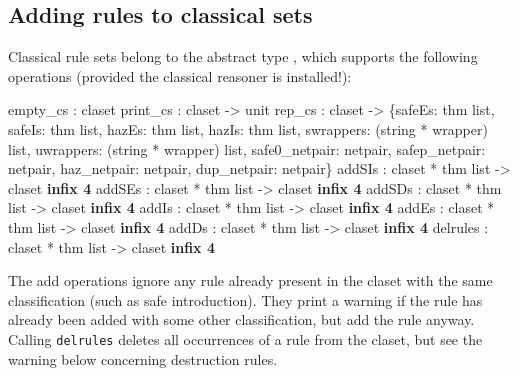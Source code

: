 \subsection{Adding rules to classical sets}
Classical rule sets belong to the abstract type , which
supports the following operations (provided the classical reasoner is
installed!):
\begin{ttbox} 
empty_cs : claset
print_cs : claset -> unit
rep_cs : claset -> \{safeEs: thm list, safeIs: thm list,
                    hazEs: thm list,  hazIs: thm list, 
                    swrappers: (string * wrapper) list, 
                    uwrappers: (string * wrapper) list,
                    safe0_netpair: netpair, safep_netpair: netpair,
                    haz_netpair: netpair, dup_netpair: netpair\}
addSIs   : claset * thm list -> claset                 \hfill{\bf infix 4}
addSEs   : claset * thm list -> claset                 \hfill{\bf infix 4}
addSDs   : claset * thm list -> claset                 \hfill{\bf infix 4}
addIs    : claset * thm list -> claset                 \hfill{\bf infix 4}
addEs    : claset * thm list -> claset                 \hfill{\bf infix 4}
addDs    : claset * thm list -> claset                 \hfill{\bf infix 4}
delrules : claset * thm list -> claset                 \hfill{\bf infix 4}
\end{ttbox}
The add operations ignore any rule already present in the claset with the same
classification (such as safe introduction).  They print a warning if the rule
has already been added with some other classification, but add the rule
anyway.  Calling \texttt{delrules} deletes all occurrences of a rule from the
claset, but see the warning below concerning destruction rules.

